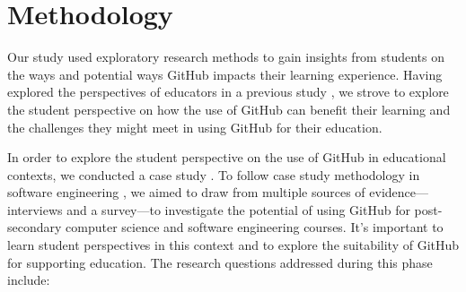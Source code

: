 \section{Methodology}
Our study used exploratory research methods \cite{easterbrook2008selecting} to gain insights from students on the ways and potential ways GitHub impacts their learning experience. Having explored the perspectives of educators in a previous study \cite{zagalsky2015emergence}, we strove to explore the student perspective on how the use of GitHub can benefit their learning and the challenges they might meet in using GitHub for their education.

In order to explore the student perspective on the use of GitHub in educational contexts, we conducted a case study \cite{yin2013case}. To follow case study methodology in software engineering \cite{runeson2012case}, we aimed to draw from multiple sources of evidence---interviews and a survey---to investigate the potential of using GitHub for post-secondary computer science and software engineering courses. It's important to learn student perspectives in this context and to explore the suitability of GitHub for supporting education. The research questions addressed during this phase include:

%

